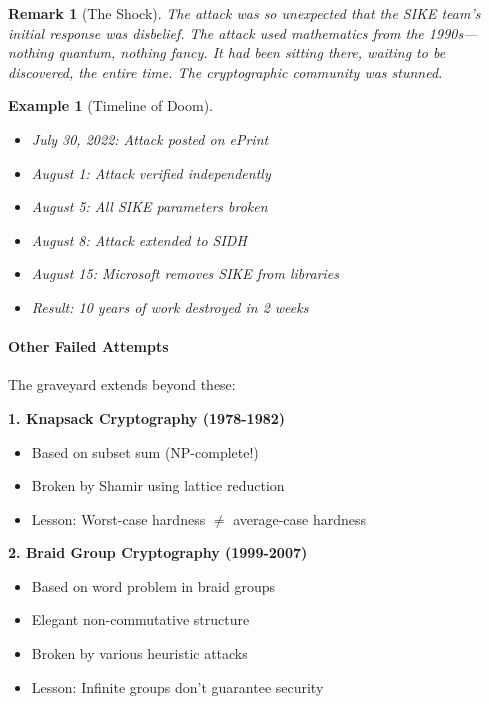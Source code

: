 \documentclass[11pt,a4paper]{article}
\newtheorem{example}{Example}
\newtheorem{remark}{Remark}
\begin{document}
\begin{remark}[The Shock]
The attack was so unexpected that the SIKE team's initial response was disbelief. The attack used mathematics from the 1990s—nothing quantum, nothing fancy. It had been sitting there, waiting to be discovered, the entire time. The cryptographic community was stunned.
\end{remark}

\begin{example}[Timeline of Doom]
\begin{itemize}
    \item July 30, 2022: Attack posted on ePrint
    \item August 1: Attack verified independently
    \item August 5: All SIKE parameters broken
    \item August 8: Attack extended to SIDH
    \item August 15: Microsoft removes SIKE from libraries
    \item Result: 10 years of work destroyed in 2 weeks
\end{itemize}
\end{example}

\paragraph{Other Failed Attempts}

The graveyard extends beyond these:

\textbf{1. Knapsack Cryptography (1978-1982)}
\begin{itemize}
    \item Based on subset sum (NP-complete!)
    \item Broken by Shamir using lattice reduction
    \item Lesson: Worst-case hardness $\neq$ average-case hardness
\end{itemize}

\textbf{2. Braid Group Cryptography (1999-2007)}
\begin{itemize}
    \item Based on word problem in braid groups
    \item Elegant non-commutative structure
    \item Broken by various heuristic attacks
    \item Lesson: Infinite groups don't guarantee security
\end{itemize}
\end{document}
